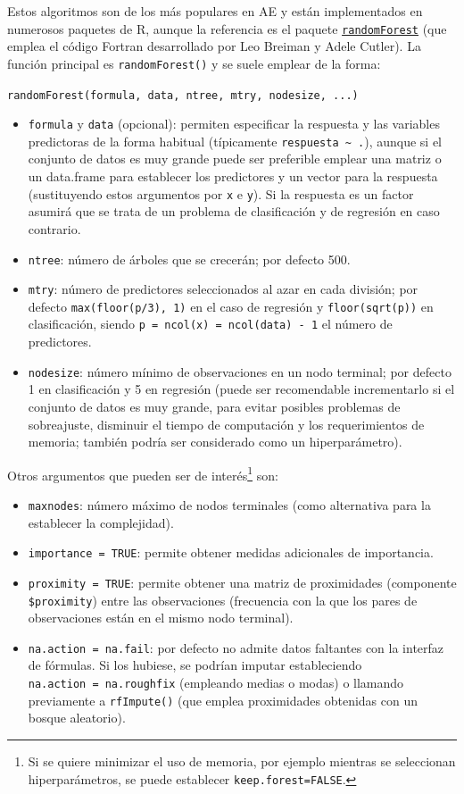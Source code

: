 \documentclass[
  spanish,
]{book}
\theoremstyle{break}
\theoremstyle{definition}
\theoremstyle{definition}
\theoremstyle{definition}
\theoremstyle{remark}
\begin{document}
Estos algoritmos son de los más populares en AE y están implementados en numerosos paquetes de R, aunque la referencia es el paquete \href{https://CRAN.R-project.org/package=randomForest}{\texttt{randomForest}} (que emplea el código Fortran desarrollado por Leo Breiman y Adele Cutler).
La función principal es \texttt{randomForest()} y se suele emplear de la forma:

\texttt{randomForest(formula,\ data,\ ntree,\ mtry,\ nodesize,\ ...)}

\begin{itemize}
\item
  \texttt{formula} y \texttt{data} (opcional): permiten especificar la respuesta y las variables predictoras de la forma habitual (típicamente \texttt{respuesta\ \textasciitilde{}\ .}), aunque si el conjunto de datos es muy grande puede ser preferible emplear una matriz o un data.frame para establecer los predictores y un vector para la respuesta (sustituyendo estos argumentos por \texttt{x} e \texttt{y}).
  Si la respuesta es un factor asumirá que se trata de un problema de clasificación y de regresión en caso contrario.
\item
  \texttt{ntree}: número de árboles que se crecerán; por defecto 500.
\item
  \texttt{mtry}: número de predictores seleccionados al azar en cada división; por defecto \texttt{max(floor(p/3),\ 1)} en el caso de regresión y \texttt{floor(sqrt(p))} en clasificación, siendo \texttt{p\ =\ ncol(x)\ =\ ncol(data)\ -\ 1} el número de predictores.
\item
  \texttt{nodesize}: número mínimo de observaciones en un nodo terminal; por defecto 1 en clasificación y 5 en regresión (puede ser recomendable incrementarlo si el conjunto de datos es muy grande, para evitar posibles problemas de sobreajuste, disminuir el tiempo de computación y los requerimientos de memoria; también podría ser considerado como un hiperparámetro).
\end{itemize}

Otros argumentos que pueden ser de interés\footnote{Si se quiere minimizar el uso de memoria, por ejemplo mientras se seleccionan hiperparámetros, se puede establecer \texttt{keep.forest=FALSE}.} son:

\begin{itemize}
\item
  \texttt{maxnodes}: número máximo de nodos terminales (como alternativa para la establecer la complejidad).
\item
  \texttt{importance\ =\ TRUE}: permite obtener medidas adicionales de importancia.
\item
  \texttt{proximity\ =\ TRUE}: permite obtener una matriz de proximidades (componente \texttt{\$proximity}) entre las observaciones (frecuencia con la que los pares de observaciones están en el mismo nodo terminal).
\item
  \texttt{na.action\ =\ na.fail}: por defecto no admite datos faltantes con la interfaz de fórmulas. Si los hubiese, se podrían imputar estableciendo \texttt{na.action\ =\ na.roughfix} (empleando medias o modas) o llamando previamente a \texttt{rfImpute()} (que emplea proximidades obtenidas con un bosque aleatorio).
\end{itemize}
\end{document}
